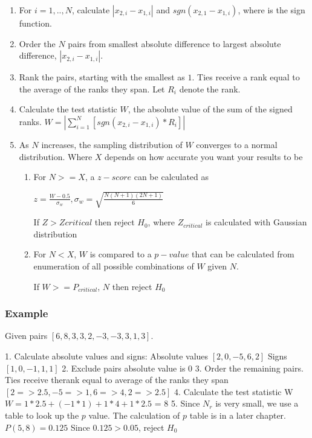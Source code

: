 \documentclass[12pt]{article}
\begin{document}
\begin{enumerate}
\item
For $i=1, .., N$, calculate $|x_{2,i} - x_{1,i}|$ and $sgn(x_{2,1} - x_{1,i})$, where  is the sign function.
\item
Order the $N$ pairs from smallest absolute difference to largest absolute difference, $|x_{2,i} - x_{1,i}|$.
\item
Rank the pairs, starting with the smallest as $1$. Ties receive a rank equal to the average of the ranks they span. Let $R_i$ denote the rank.
\item
Calculate the test statistic $W$, the absolute value of the sum of the signed ranks. $W=|\sum\limits_{i=1}^{N} [sgn(x_{2,i} - x_{1,i})*R_i]|$
\item
As $N$ increases, the sampling distribution of $W$ converges to a normal distribution. Where $X$ depends on how accurate you want your results to be
\begin{enumerate}
\item
For $N >= X$, a $z-score$ can be calculated as

$z=\frac{W-0.5}{\sigma_w},\sigma_w = \sqrt{\frac{N(N + 1)(2N + 1)}{6}}$

If $Z > Zcritical$ then reject $H_0$, where $Z_{critical}$ is calculated with Gaussian distribution

\item
For $N < X$, $W$  is compared to a $p-value$ that can be calculated from enumeration of all possible combinations of $W$ given $N$.

If $W >= P_{critical}$, $N$ then reject $H_0$
\end{enumerate}
\end{enumerate}

\subsubsection{Example}
Given pairs $[{6, 8}, {3, 3}, {2, -3}, {-3, 3}, {1, 3}]$.

1. Calculate absolute values and signs:
Absolute values $[2, 0, -5, 6, 2]$
Signs $[1, 0, -1, 1, 1]$
2. Exclude pairs absolute value is $0$
3. Order the remaining pairs. Ties receive therank equal to average of the ranks they span
$[{2 => 2.5}, {-5 => 1}, {6 => 4}, {2 => 2.5}]$
4. Calculate the test statistic W
$W = 1*2.5 + (-1*1) + 1*4 + 1*2.5$ = 8
5. Since $N_r$ is very small, we use a table to look up the $p$ value. The calculation of $p$ table is in a later chapter.
$P(5, 8) = 0.125$
Since $0.125 > 0.05$, reject $H_0$
\end{document}
